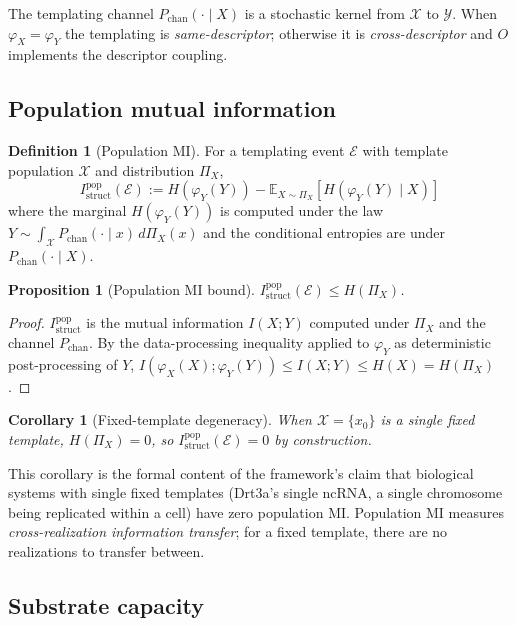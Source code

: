 \documentclass[11pt]{article}
\theoremstyle{plain}
\newtheorem{proposition}[theorem]{Proposition}
\newtheorem{corollary}[theorem]{Corollary}
\theoremstyle{definition}
\newtheorem{definition}[theorem]{Definition}
\newcommand{\Istructpop}{I_{\mathrm{struct}}^{\mathrm{pop}}}
\newcommand{\descX}{\varphi_X}
\newcommand{\descY}{\varphi_Y}
\begin{document}
The templating channel $P_{\mathrm{chan}}(\cdot \mid X)$ is a stochastic kernel from $\mathcal{X}$ to $\mathcal{Y}$. When $\descX = \descY$ the templating is \emph{same-descriptor}; otherwise it is \emph{cross-descriptor} and $O$ implements the descriptor coupling.

\subsection{Population mutual information}

\begin{definition}[Population MI]
For a templating event $\mathcal{E}$ with template population $\mathcal{X}$ and distribution $\Pi_X$,
\[
\Istructpop(\mathcal{E}) := H(\descY(Y)) - \mathbb{E}_{X \sim \Pi_X}\left[ H(\descY(Y) \mid X) \right]
\]
where the marginal $H(\descY(Y))$ is computed under the law $Y \sim \int_\mathcal{X} P_{\mathrm{chan}}(\cdot \mid x) \, d\Pi_X(x)$ and the conditional entropies are under $P_{\mathrm{chan}}(\cdot \mid X)$.
\end{definition}

\begin{proposition}[Population MI bound]
\label{prop:pop_bound}
$\Istructpop(\mathcal{E}) \le H(\Pi_X)$.
\end{proposition}

\begin{proof}
$\Istructpop$ is the mutual information $I(X; Y)$ computed under $\Pi_X$ and the channel $P_{\mathrm{chan}}$. By the data-processing inequality applied to $\descY$ as deterministic post-processing of $Y$, $I(\descX(X); \descY(Y)) \le I(X; Y) \le H(X) = H(\Pi_X)$.
\end{proof}

\begin{corollary}[Fixed-template degeneracy]
\label{cor:fixed_template}
When $\mathcal{X} = \{x_0\}$ is a single fixed template, $H(\Pi_X) = 0$, so $\Istructpop(\mathcal{E}) = 0$ by construction.
\end{corollary}

This corollary is the formal content of the framework's claim that biological systems with single fixed templates (Drt3a's single ncRNA, a single chromosome being replicated within a cell) have zero population MI. Population MI measures \emph{cross-realization information transfer}; for a fixed template, there are no realizations to transfer between.

\subsection{Substrate capacity}
\end{document}
